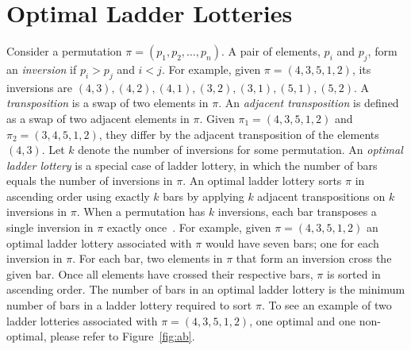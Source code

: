 \section{Optimal Ladder Lotteries}
Consider a permutation $\pi=(p_{1},p_{2}, \dots ,p_{n})$.
A pair of elements, $p_{i}$ and $p_{j}$, form an \emph{inversion} if $p_{i}>p_{j}$ and $i<j$. 
For example, given $\pi=(4,3,5,1,2)$, its inversions are $(4,3),(4,2),(4,1),(3,2),(3,1),(5,1),(5,2)$.
A \emph{transposition} is a swap of two elements in $\pi$.
An \emph{adjacent transposition} is defined as a swap of two adjacent elements in $\pi$.
Given $\pi_{1}=(4,3,5,1,2)$ and $\pi_{2}=(3,4,5,1,2)$, they differ by the adjacent 
transposition of the elements $(4,3)$.
Let $k$ denote the number of inversions for some permutation.
An \emph{optimal ladder lottery} is a special case of ladder 
lottery, in which the number of bars equals the number of inversions in $\pi$. 
An optimal ladder lottery sorts $\pi$ in ascending order using exactly $k$ bars by applying 
$k$ adjacent transpositions on $k$ inversions in $\pi$. When a permutation has $k$ inversions, each bar 
transposes a single inversion in $\pi$ exactly once~\cite{A1}.
For example, given $\pi=(4,3,5,1,2)$ an optimal ladder lottery associated with $\pi$ would have 
seven bars; one for each inversion in $\pi$. For each bar, two elements in $\pi$ that form 
an inversion cross the given bar. 
Once all elements have crossed their respective bars, $\pi$ is sorted in ascending order. The number of bars in an optimal ladder lottery 
is the minimum number of bars in a ladder lottery required to sort $\pi$. 
To see an example of two ladder lotteries associated with 
$\pi=(4,3,5,1,2)$, one optimal and one non-optimal, please refer to Figure~\ref{fig:ab}.\par
